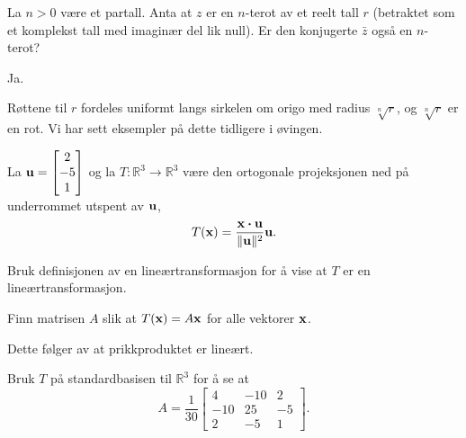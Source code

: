 \begin{oppgave}
La $n>0$ være et partall. Anta at $z$ er en $n$-terot av et reelt tall $r$ (betraktet som et komplekst tall med imaginær del lik null). Er den konjugerte $\bar{z}$ også en $n$-terot?
\end{oppgave}

\begin{losning}
Ja.

\noindent
Røttene til $r$ fordeles uniformt langs sirkelen om origo med radius $\sqrt[n]{r}$, og $\sqrt[n]{r}$ er en rot. Vi har sett eksempler på dette tidligere i øvingen.
\end{losning}



\begin{oppgave}
La $\mathbf{u}=\begin{bmatrix} 2 \\ -5 \\ 1 \end{bmatrix}$ og la $T:\mathbb{R}^3\rightarrow \mathbb{R}^3$ være den ortogonale projeksjonen ned på underrommet utspent av $\mathbf{u}$,
$$T(\mathbf{x})=\frac{\mathbf{x}\boldsymbol{\cdot} \mathbf{u}}{\|\mathbf{u} \|^2} \mathbf{u}.$$

\begin{punkt}
Bruk definisjonen av en lineærtransformasjon for å vise at $T$ er en lineærtransformasjon.
\end{punkt}

\begin{punkt}
Finn matrisen $A$ slik at $T(\mathbf{x})=A\mathbf{x}$ for alle vektorer $\mathbf{x}$.
\end{punkt}

\end{oppgave}

\begin{losning}

\begin{punkt}
Dette følger av at prikkproduktet er lineært.
\end{punkt}

\begin{punkt}
Bruk $T$ på standardbasisen til $\mathbb{R}^3$ for å se at
$$A=\frac{1}{30}\begin{bmatrix}
4 & -10 & 2\\
-10 & 25 & -5\\
2 & -5 & 1
\end{bmatrix}.$$
\end{punkt}

\end{losning}